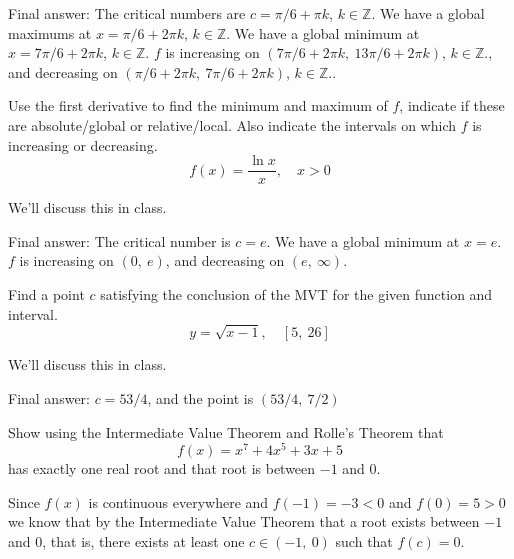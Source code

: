 \documentclass[12pt,addpoints, answers, fleqn]{exam}
\begin{document}
\begin{questions}
\begin{solution}
Final answer: The critical numbers are $c=\pi/6+\pi k$, $k \in \mathbb{Z}$. We have a global maximums at $x=\pi/6 + 2\pi k$,  $k \in \mathbb{Z}$. We have a global minimum at $x=7\pi/6+2\pi k$, $k \in \mathbb{Z}$. $f$ is increasing on $\left( 7 \pi / 6 + 2 \pi k, \ 13 \pi /6 + 2 \pi k \right)$, $k \in \mathbb{Z}$., and decreasing on $\left( \pi /6 + 2 \pi k, \ 7 \pi /6 + 2 \pi k \right)$, $k \in \mathbb{Z}$..
\end{solution}


\question Use the first derivative to find the minimum and maximum of $f$, indicate if these are absolute/global or relative/local. Also indicate the intervals on which $f$ is increasing or decreasing.
\[
f\left(x \right) = \frac{\ln x}{x}, \quad x>0
\]
\begin{solution}
We'll discuss this in class.

Final answer: The critical number is $c=e$. We have a global minimum at $x=e$. $f$ is increasing on $\left( 0, \ e \right)$, and decreasing on $\left( e, \ \infty \right)$.
\end{solution}


\question Find a point $c$ satisfying the conclusion of the MVT for the given function and interval.
\[
y = \sqrt{x-1}, \quad \left[ 5, \ 26 \right]
\]

\begin{solution}
We'll discuss this in class.

Final answer: $c=53/4$, and the point is $\left( 53/4, \ 7/2\right)$
\end{solution}



\question Show using the Intermediate Value Theorem and Rolle's Theorem  that
\[
f\left( x \right) = x^7 + 4x^5 + 3x + 5
\]
has exactly one real root and that root is between $-1$ and $0$.

\begin{solution}
Since $f\left( x \right)$ is continuous everywhere and $f\left( -1 \right) = -3 < 0$ and $f\left( 0 \right) = 5 > 0$ we know that by the Intermediate Value Theorem that a root exists between $-1$ and $0$, that is, there exists at least one $c \in \left(-1, \ 0 \right)$ such that $f\left( c \right) =0$.


\end{solution}
\end{questions}
\end{document}
